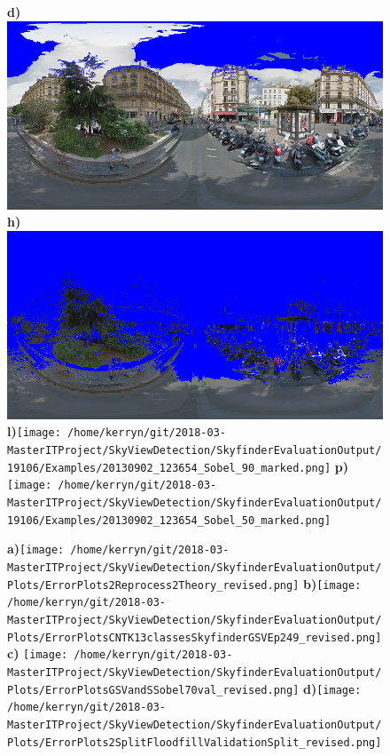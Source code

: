 \documentclass{article}
\begin{document}
\begin{figure}
\textbf{\scriptsize{d)}}\includegraphics[scale=0.13]{Images/2/panorama-JtVHmEl7WCiz1xJ0bcJpBg-1_Sobel_90_marked.png} %
\textbf{\scriptsize{h)}}\includegraphics[scale=0.13]{Images/2/panorama-JtVHmEl7WCiz1xJ0bcJpBg-1_Sobel_50_marked.png} %
\textbf{\scriptsize{l)}}\texttt{[image: /home/kerryn/git/2018-03-MasterITProject/SkyViewDetection/SkyfinderEvaluationOutput/19106/Examples/20130902\_123654\_Sobel\_90\_marked.png]} %
\textbf{\scriptsize{p)}}\texttt{[image: /home/kerryn/git/2018-03-MasterITProject/SkyViewDetection/SkyfinderEvaluationOutput/19106/Examples/20130902\_123654\_Sobel\_50\_marked.png]} 

\end{figure} 

\clearpage














\begin{figure}
\centering
\textbf{\scriptsize{a)}}\texttt{[image: /home/kerryn/git/2018-03-MasterITProject/SkyViewDetection/SkyfinderEvaluationOutput/Plots/ErrorPlots2Reprocess2Theory\_revised.png]}
\textbf{\scriptsize{b)}}\texttt{[image: /home/kerryn/git/2018-03-MasterITProject/SkyViewDetection/SkyfinderEvaluationOutput/Plots/ErrorPlotsCNTK13classesSkyfinderGSVEp249\_revised.png]}
\\
\textbf{\scriptsize{c)}}
\texttt{[image: /home/kerryn/git/2018-03-MasterITProject/SkyViewDetection/SkyfinderEvaluationOutput/Plots/ErrorPlotsGSVandSSobel70val\_revised.png]}
\textbf{\scriptsize{d)}}\texttt{[image: /home/kerryn/git/2018-03-MasterITProject/SkyViewDetection/SkyfinderEvaluationOutput/Plots/ErrorPlots2SplitFloodfillValidationSplit\_revised.png]}
\end{figure}

\clearpage
\end{document}
